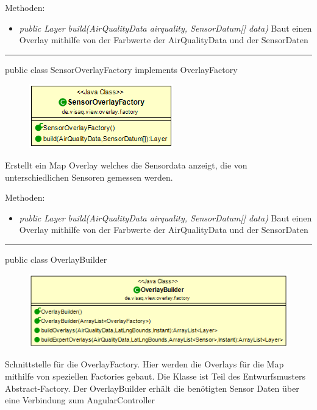 Methoden:
\begin{itemize}
    \item \emph{public Layer build(AirQualityData airquality, SensorDatum[] data)}  Baut einen Overlay mithilfe von der Farbwerte der AirQualityData und der SensorDaten
\end{itemize}

\rule{\textwidth}{0.4pt}
public class SensorOverlayFactory implements OverlayFactory

\begin{minipage}{0.3\textwidth}
    \begin{figure}[H]
        \includegraphics[scale = 0.5]{media/frontend/view/de.view.overlay.factory/SensorOverlayFactory_Class.png}
    \end{figure}
    \end{minipage} \hfill
    \begin{minipage}{0.6\textwidth}
        Erstellt ein Map Overlay welches die Sensordata anzeigt, die von unterschiedlichen Sensoren gemessen werden.
\end{minipage}

Methoden:
\begin{itemize}
    \item \emph{public Layer build(AirQualityData airquality, SensorDatum[] data)}  Baut einen Overlay mithilfe von der Farbwerte der AirQualityData und der SensorDaten
\end{itemize}

\clearpage %

\rule{\textwidth}{0.4pt}
public class OverlayBuilder

\begin{minipage}{0.6\textwidth}
    \begin{figure}[H]
        \includegraphics[scale = 0.5]{media/frontend/view/de.view.overlay.factory/OverlayBuilder_Class.png}
    \end{figure}
    \end{minipage} \hfill
    \begin{minipage}{0.4\textwidth}
Schnittstelle für die OverlayFactory. Hier werden die Overlays für die Map mithilfe von speziellen Factories gebaut. Die Klasse ist Teil des Entwurfsmusters Abstract-Factory. Der OverlayBuilder erhält die benötigten Sensor Daten über eine Verbindung zum AngularController
\end{minipage}

